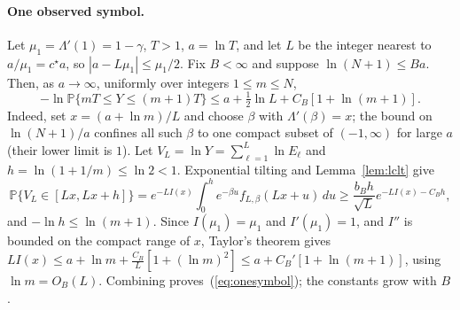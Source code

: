 \documentclass[anon]{alt2027}
\newcommand{\rate}{I}
\newcommand{\Prob}{\mathbb{P}}
\newcommand{\cstar}{c^{\star}}
\renewcommand{\eqref}[1]{(\ref{#1})}
\begin{document}
\paragraph{One observed symbol.}
Let $\mu_1=\Lambda'(1)=1-\gamma$, $T>1$, $a=\ln T$, and let $L$ be the integer nearest to $a/\mu_1=\cstar a$, so $|a-L\mu_1|\le\mu_1/2$. Fix $B<\infty$ and suppose $\ln(N+1)\le Ba$. Then, as $a\to\infty$, uniformly over integers $1\le m\le N$,
\begin{equation}
\label{eq:onesymbol}
-\ln\Prob\{mT\le Y\le(m+1)T\}\le a+\tfrac12\ln L+C_B[1+\ln(m+1)].
\end{equation}
Indeed, set $x=(a+\ln m)/L$ and choose $\beta$ with $\Lambda'(\beta)=x$; the bound on $\ln(N+1)/a$ confines all such $\beta$ to one compact subset of $(-1,\infty)$ for large $a$ (their lower limit is $1$). Let $V_L=\ln Y=\sum_{\ell=1}^L\ln E_\ell$ and $h=\ln(1+1/m)\le\ln2<1$. Exponential tilting and Lemma~\ref{lem:lclt} give
\[
\Prob\{V_L\in[Lx,Lx+h]\}=e^{-L\rate(x)}\int_0^he^{-\beta u}f_{L,\beta}(Lx+u)\,du\ge\frac{b_Bh}{\sqrt L}e^{-L\rate(x)-C_Bh},
\]
and $-\ln h\le\ln(m+1)$. Since $\rate(\mu_1)=\mu_1$ and $\rate'(\mu_1)=1$, and $\rate''$ is bounded on the compact range of $x$, Taylor's theorem gives $L\rate(x)\le a+\ln m+\frac{C_B}{L}[1+(\ln m)^2]\le a+C_B'[1+\ln(m+1)]$, using $\ln m=O_B(L)$. Combining proves~\eqref{eq:onesymbol}; the constants grow with $B$.
\end{document}
